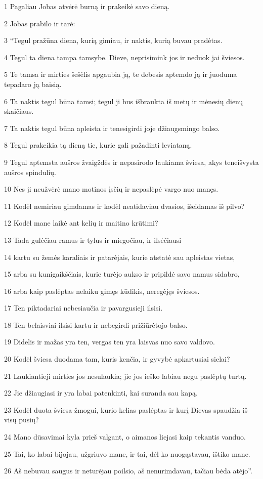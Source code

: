 \par 1 Pagaliau Jobas atvėrė burną ir prakeikė savo dieną. 
\par 2 Jobas prabilo ir tarė: 
\par 3 “Tegul pražūna diena, kurią gimiau, ir naktis, kurią buvau pradėtas. 
\par 4 Tegul ta diena tampa tamsybe. Dieve, neprisimink jos ir neduok jai šviesos. 
\par 5 Te tamsa ir mirties šešėlis apgaubia ją, te debesis aptemdo ją ir juoduma tepadaro ją baisią. 
\par 6 Ta naktis tegul būna tamsi; tegul ji bus išbraukta iš metų ir mėnesių dienų skaičiaus. 
\par 7 Ta naktis tegul būna apleista ir tenesigirdi joje džiaugsmingo balso. 
\par 8 Tegul prakeikia tą dieną tie, kurie gali pažadinti leviataną. 
\par 9 Tegul aptemsta aušros žvaigždės ir nepasirodo laukiama šviesa, akys teneišvysta aušros spindulių. 
\par 10 Nes ji neužvėrė mano motinos įsčių ir nepaslėpė vargo nuo manęs. 
\par 11 Kodėl nemiriau gimdamas ir kodėl neatidaviau dvasios, išeidamas iš pilvo? 
\par 12 Kodėl mane laikė ant kelių ir maitino krūtimi? 
\par 13 Tada gulėčiau ramus ir tylus ir miegočiau, ir ilsėčiausi 
\par 14 kartu su žemės karaliais ir patarėjais, kurie atstatė sau apleistas vietas, 
\par 15 arba su kunigaikščiais, kurie turėjo aukso ir pripildė savo namus sidabro, 
\par 16 arba kaip paslėptas nelaiku gimęs kūdikis, neregėjęs šviesos. 
\par 17 Ten piktadariai nebesiaučia ir pavargusieji ilsisi. 
\par 18 Ten belaisviai ilsisi kartu ir nebegirdi prižiūrėtojo balso. 
\par 19 Didelis ir mažas yra ten, vergas ten yra laisvas nuo savo valdovo. 
\par 20 Kodėl šviesa duodama tam, kuris kenčia, ir gyvybė apkartusiai sielai? 
\par 21 Laukiantieji mirties jos nesulaukia; jie jos ieško labiau negu paslėptų turtų. 
\par 22 Jie džiaugiasi ir yra labai patenkinti, kai suranda sau kapą. 
\par 23 Kodėl duota šviesa žmogui, kurio kelias paslėptas ir kurį Dievas spaudžia iš visų pusių? 
\par 24 Mano dūsavimai kyla prieš valgant, o aimanos liejasi kaip tekantis vanduo. 
\par 25 Tai, ko labai bijojau, užgriuvo mane, ir tai, dėl ko nuogąstavau, ištiko mane. 
\par 26 Aš nebuvau saugus ir neturėjau poilsio, aš nenurimdavau, tačiau bėda atėjo”.



